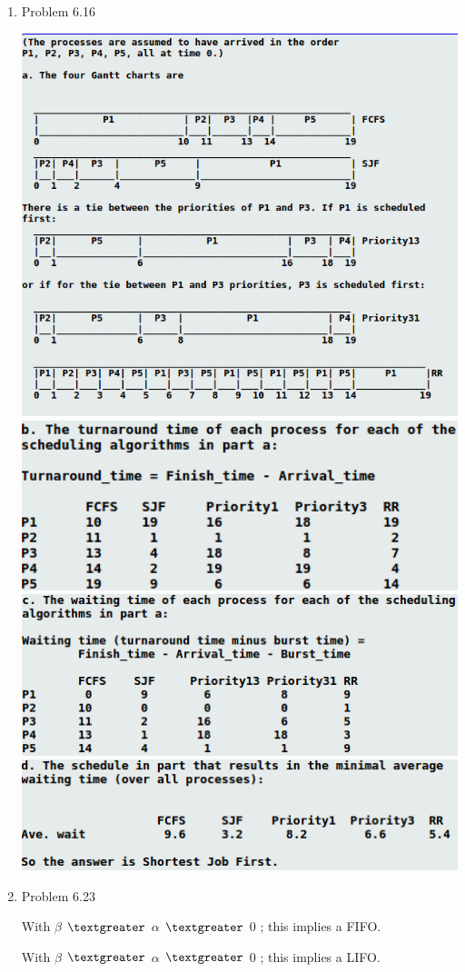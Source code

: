 \documentclass[a4paper,11pt]{article}
\theoremstyle{mytheor}
\begin{document}
\begin{enumerate}
\item {Problem 6.16}
    \par 
    \includegraphics[width=1\textwidth]{q2}
    \includegraphics[width=1\textwidth]{q2b}
    \includegraphics[width=1\textwidth]{q2c}
    \includegraphics[width=1\textwidth]{q2d}
    \pagebreak
\item{Problem 6.23}
    \par With $\beta$ $\textgreater$ $\alpha$ $\textgreater$ $0$ ; this implies a FIFO. 
    \par With $\beta$ $\textgreater$ $\alpha$ $\textgreater$ $0$ ; this implies a LIFO. 


\end{enumerate}
\end{document}
